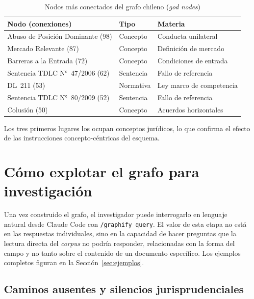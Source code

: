 \documentclass[12pt,a4paper]{article}
\begin{document}
\begin{table}[htbp]
\centering
\caption{Nodos más conectados del grafo chileno (\emph{god nodes})}
\label{tab:god-nodes}
\small
\begin{tabularx}{\linewidth}{>{\raggedright}p{5.8cm} l >{\raggedright\arraybackslash}X}
\toprule
\rowcolor{tabhead}\color{black}\textbf{Nodo (conexiones)} &
  \color{black}\textbf{Tipo} &
  \color{black}\textbf{Materia} \\
\midrule
Abuso de Posición Dominante (98) & Concepto & Conducta unilateral \\
Mercado Relevante (87) & Concepto & Definición de mercado \\
Barreras a la Entrada (72) & Concepto & Condiciones de entrada \\
Sentencia TDLC N°~47/2006 (62) & Sentencia & Fallo de referencia \\
DL~211 (53) & Normativa & Ley marco de competencia \\
Sentencia TDLC N°~80/2009 (52) & Sentencia & Fallo de referencia \\
Colusión (50) & Concepto & Acuerdos horizontales \\
\bottomrule
\end{tabularx}
\end{table}

\noindent
Los tres primeros lugares los ocupan conceptos jurídicos, lo que confirma 
el efecto de las instrucciones concepto-céntricas del
esquema.

\section{Cómo explotar el grafo para investigación}
\label{sec:explotar}

Una vez construido el grafo, el investigador puede interrogarlo en lenguaje
natural desde Claude Code con \texttt{/graphify query}. El valor de esta etapa
no está en las respuestas individuales, sino en la capacidad de hacer preguntas
que la lectura directa del \textit{corpus} no podría responder, relacionadas con la
forma del campo y no tanto sobre el contenido de un documento específico. Los ejemplos
completos figuran en la Sección~\ref{sec:ejemplos}.

\subsection{Caminos ausentes y silencios jurisprudenciales}
\end{document}
